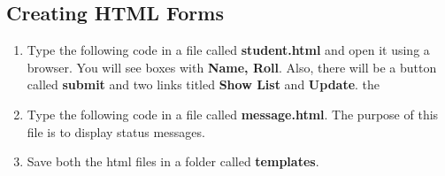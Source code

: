 \documentclass[journal,12pt,twocolumn]{IEEEtran}
\begin{document}

\subsection{Creating HTML Forms}
%

%

\begin{enumerate}
\item Type the following code in a file called \textbf{student.html} and open it using a browser.  You will see boxes with \textbf{Name, Roll}.  Also, there will be a button called \textbf{submit} and two links titled \textbf{Show List} and \textbf{Update}.  the 



\item Type the following code in a file called \textbf{message.html}.  The purpose of this file is to display status messages.

\item Save both the html files in a folder called \textbf{templates}.
\end{enumerate}
\end{document}
